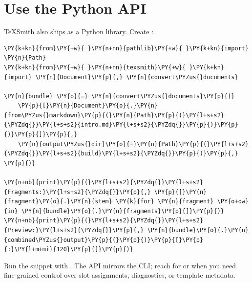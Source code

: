\documentclass[a4paper,twoside]{article}
\begin{document}
\section{Use the Python API}
TeXSmith also ships as a Python library. Create :
\begin{tscode}[lang=python, engine=pygments]
\begin{Verbatim}[commandchars=\\\{\},breaklines, breakanywhere, commandchars=\\\{\}]
\PY{k+kn}{from}\PY{+w}{ }\PY{n+nn}{pathlib}\PY{+w}{ }\PY{k+kn}{import} \PY{n}{Path}
\PY{k+kn}{from}\PY{+w}{ }\PY{n+nn}{texsmith}\PY{+w}{ }\PY{k+kn}{import} \PY{n}{Document}\PY{p}{,} \PY{n}{convert\PYZus{}documents}

\PY{n}{bundle} \PY{o}{=} \PY{n}{convert\PYZus{}documents}\PY{p}{(}
    \PY{p}{[}\PY{n}{Document}\PY{o}{.}\PY{n}{from\PYZus{}markdown}\PY{p}{(}\PY{n}{Path}\PY{p}{(}\PY{l+s+s2}{\PYZdq{}}\PY{l+s+s2}{intro.md}\PY{l+s+s2}{\PYZdq{}}\PY{p}{)}\PY{p}{)}\PY{p}{]}\PY{p}{,}
    \PY{n}{output\PYZus{}dir}\PY{o}{=}\PY{n}{Path}\PY{p}{(}\PY{l+s+s2}{\PYZdq{}}\PY{l+s+s2}{build}\PY{l+s+s2}{\PYZdq{}}\PY{p}{)}\PY{p}{,}
\PY{p}{)}

\PY{n+nb}{print}\PY{p}{(}\PY{l+s+s2}{\PYZdq{}}\PY{l+s+s2}{Fragments:}\PY{l+s+s2}{\PYZdq{}}\PY{p}{,} \PY{p}{[}\PY{n}{fragment}\PY{o}{.}\PY{n}{stem} \PY{k}{for} \PY{n}{fragment} \PY{o+ow}{in} \PY{n}{bundle}\PY{o}{.}\PY{n}{fragments}\PY{p}{]}\PY{p}{)}
\PY{n+nb}{print}\PY{p}{(}\PY{l+s+s2}{\PYZdq{}}\PY{l+s+s2}{Preview:}\PY{l+s+s2}{\PYZdq{}}\PY{p}{,} \PY{n}{bundle}\PY{o}{.}\PY{n}{combined\PYZus{}output}\PY{p}{(}\PY{p}{)}\PY{p}{[}\PY{p}{:}\PY{l+m+mi}{120}\PY{p}{]}\PY{p}{)}
\end{Verbatim}
\end{tscode}
Run the snippet with . The API mirrors the CLI; reach for  or  when you need fine-grained control over slot assignments, diagnostics, or template metadata.
\end{document}
